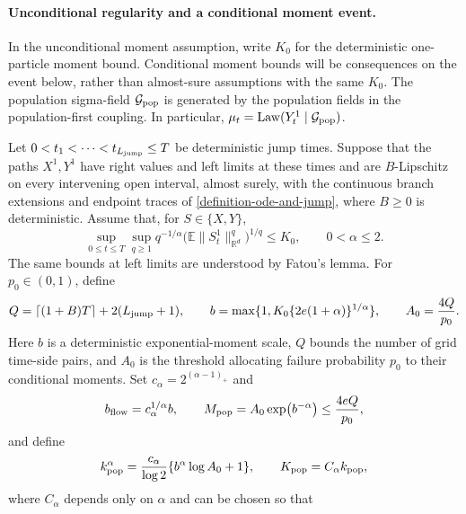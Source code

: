 \paragraph{Unconditional regularity and a conditional moment event.}
In the unconditional moment assumption, write $K_0$ for the deterministic
one-particle moment bound. Conditional moment bounds will be consequences
on the event below, rather than almost-sure assumptions with the same $K_0$.
The population sigma-field $\mathcal G_{\rm pop}$ is generated by the
population fields in the population-first coupling. In particular,
$\mu_t=\operatorname{Law}(Y_t^1\mid\mathcal G_{\rm pop})$.

\begin{lemma}
\label{lem:population-conditional-moment-localization}\label{lem:population-moment-event}
Let $0<t_1<\cdots<t_{L_{\mathrm{jump}}}\le T$ be deterministic jump times. Suppose that
the paths $X^1,Y^1$ have right values and left limits at these times and
are $B$-Lipschitz on every intervening open interval, almost surely,
with the continuous branch extensions and endpoint traces of
\cref{definition-ode-and-jump},
where $B\ge0$ is deterministic. Assume that, for $S\in\{X,Y\}$,
\begin{equation}
\label{eq:population-unconditional-moment-input}
 \sup_{0\le t\le T}\sup_{q\ge1}
 q^{-1/\alpha}\bigl(\mathbb E\|S_t^1\|_{\mathbb R^d}^q\bigr)^{1/q}
 \le K_0,
 \qquad 0<\alpha\le2.
\end{equation}
The same bounds at left limits are understood by Fatou's lemma.
For $p_0\in(0,1)$, define
\[
 Q=\left\lceil(1+B)T\right\rceil+2(L_{\mathrm{jump}}+1),\qquad
 b=\max\{1,K_0\{2e(1+\alpha)\}^{1/\alpha}\},\qquad
 A_0=\frac{4Q}{p_0}.
\]
Here $b$ is a deterministic exponential-moment scale, $Q$ bounds the
number of grid time-side pairs, and $A_0$ is the threshold allocating
failure probability $p_0$ to their conditional moments.
Set $c_\alpha=2^{(\alpha-1)_+}$ and
\begin{equation}
\label{eq:population-exponential-amplitude}
 b_{\rm flow}=c_\alpha^{1/\alpha}b,\qquad
 M_{\rm pop}=A_0\exp(b^{-\alpha})\le\frac{4eQ}{p_0},
\end{equation}
and define
\begin{equation}
\label{eq:population-exponential-scale}
 k_{\rm pop}^{\alpha}
 =\frac{c_\alpha}{\log2}\{b^\alpha\log A_0+1\},
 \qquad
 K_{\rm pop}=C_\alpha k_{\rm pop},
\end{equation}
where $C_\alpha$ depends only on $\alpha$ and can be chosen so that

\end{lemma}
